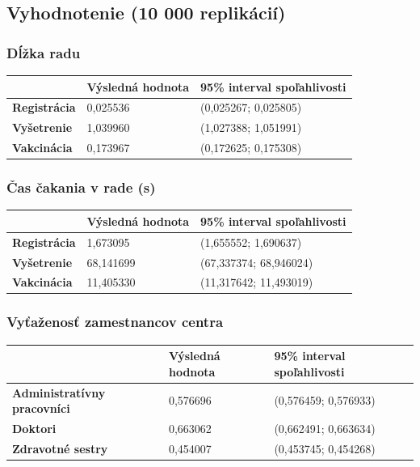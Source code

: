 \documentclass[letterpaper]{article}
\begin{document}
	\subsection*{Vyhodnotenie (10 000 replikácií)}

	\subsubsection*{Dĺžka radu}

	\begin{table}[hbt!]
		\begin{tabular}{p{6cm}|p{4.5cm}p{4.5cm}}
			& \textbf{Výsledná hodnota} & \textbf{95\% interval spoľahlivosti} \\
			\hline\hline
			\textbf{Registrácia} 	& 0,025536            & (0,025267; 0,025805)			
			\\\hline
			\textbf{Vyšetrenie}  	& 1,039960            & (1,027388; 1,051991)	
			\\\hline
			\textbf{Vakcinácia}  	& 0,173967            & (0,172625; 0,175308)
		\end{tabular}
	\end{table}

	\subsubsection*{Čas čakania v rade (s)}
	
	\begin{table}[hbt!]
		\begin{tabular}{p{6cm}|p{4.5cm}p{4.5cm}}
			& \textbf{Výsledná hodnota} & \textbf{95\% interval spoľahlivosti} \\
			\hline\hline
			\textbf{Registrácia} 	& 1,673095            & (1,655552; 1,690637)			
			\\\hline
			\textbf{Vyšetrenie}  	& 68,141699           & (67,337374; 68,946024)	
			\\\hline
			\textbf{Vakcinácia}  	& 11,405330           & (11,317642; 11,493019)
		\end{tabular}
	\end{table}

	\subsubsection*{Vyťaženosť zamestnancov centra}
	
	\begin{table}[hbt!]
		\begin{tabular}{p{6cm}|p{4.5cm}p{4.5cm}}
			& \textbf{Výsledná hodnota} & \textbf{95\% interval spoľahlivosti} \\
			\hline\hline
			\textbf{Administratívny pracovníci} 	& 0,576696            & (0,576459; 0,576933)			
			\\\hline
			\textbf{Doktori}  						& 0,663062            & (0,662491; 0,663634)	
			\\\hline
			\textbf{Zdravotné sestry}  				& 0,454007            & (0,453745; 0,454268)
		\end{tabular}
	\end{table}
\end{document}
